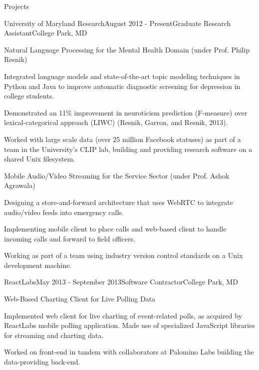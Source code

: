 \documentclass{resume} %
\begin{document}
\begin{rSection}{Projects}

\begin{rSubsection}{University of Maryland Research}{August 2012 - Present}{Graduate Research Assistant}{College Park, MD}
\item
\begin{rWorkProject}{Natural Language Processing for the Mental Health Domain (under Prof. Philip Resnik)}
\item Integrated language models and state-of-the-art topic modeling techniques in Python and Java to improve automatic diagnostic screening for depression in college students.
\item Demonstrated an 11\% improvement in neuroticism prediction (F-measure) over lexical-categorical approach (LIWC) (Resnik, Garron, and Resnik, 2013).
\item Worked with large scale data (over 25 million Facebook statuses) as part of a team in the University's CLIP lab, building and providing research software on a shared Unix filesystem.
\end{rWorkProject}
\item
\begin{rWorkProject}{Mobile Audio/Video Streaming for the Service Sector (under Prof. Ashok Agrawala)}
\item Designing a store-and-forward architecture that uses WebRTC to integrate audio/video feeds into emergency calls.
\item Implementing mobile client to place calls and web-based client to handle incoming calls and forward to field officers.
\item Working as part of a team using industry version control standards on a Unix development machine.
\end{rWorkProject}
\end{rSubsection}

\begin{rSubsection}{ReactLabs}{May 2013 - September 2013}{Software Contractor}{College Park, MD}
\item
\begin{rWorkProject}{Web-Based Charting Client for Live Polling Data}
\item Implemented web client for live charting of event-related polls, as acquired by ReactLabs mobile polling application. Made use of specialized JavaScript libraries for streaming and charting data.
\item Worked on front-end in tandem with collaborators at Palomino Labs building the data-providing back-end.
\end{rWorkProject}
\end{rSubsection}


\end{rSection}
\end{document}

